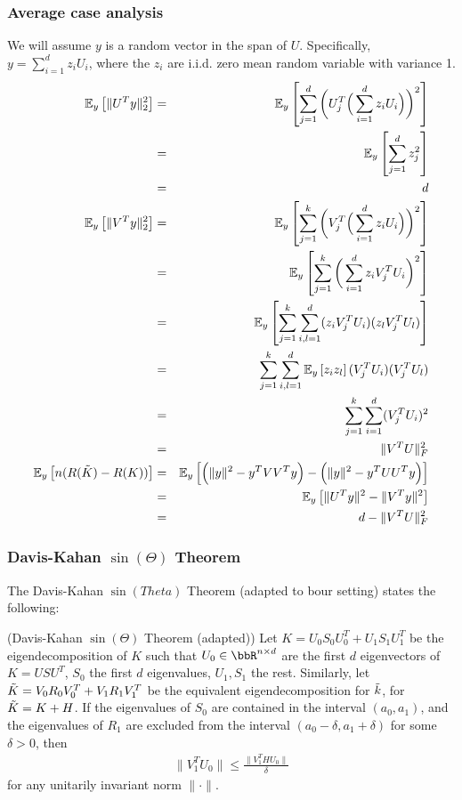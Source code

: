 \subsubsection{Average case analysis}
We will assume $y$ is a random vector in the span of $U$.
Specifically, $y = \sum_{i=1}^d z_i U_i$, where the $z_i$ are i.i.d. zero mean random variable with variance 1.
\begin{eqnarray*}
	\expect{y}{\|U^T y\|_2^2} &=& \expect{y}{\sum_{j=1}^d \bigg( U_j^T \Big(\sum_{i=1}^d z_i U_i\Big)\bigg)^2} \\
	&=& \expect{y}{\sum_{j=1}^d z_j^2} \\
	&=& d \\
	\expect{y}{\|V^T y\|_2^2} &=& \expect{y}{\sum_{j=1}^k \bigg( V_j^T \Big(\sum_{i=1}^d z_i U_i\Big)\bigg)^2} \\
	&=& \expect{y}{\sum_{j=1}^k \bigg(\sum_{i=1}^d z_i V_j^TU_i\bigg)^2} \\
	&=& \expect{y}{\sum_{j=1}^k \sum_{i,l=1}^d (z_i V_j^TU_i) (z_l V_j^TU_l) }\\
	&=& \sum_{j=1}^k \sum_{i,l=1}^d \expect{y}{z_i z_l} (V_j^TU_i) (V_j^TU_l) \\
	&=& \sum_{j=1}^k \sum_{i=1}^d (V_j^TU_i)^2 \\
	&=& \|V^T U\|_F^2\\
	\expect{y}{n(R(\tK) - R(K))} &=& \expect{y}{\Big(\|y\|^2 - y^T VV^T y\Big) - \Big(\|y\|^2 - y^T UU^T y\Big)}\\
	&=& \expect{y}{\|U^T y\|^2 - \|V^Ty\|^2}\\
	&=& d -  \|V^T U\|_F^2\\
\end{eqnarray*}

\subsubsection{Davis-Kahan $\sin(\Theta)$ Theorem}
The Davis-Kahan $\sin(Theta)$ Theorem (adapted to bour setting) states the following:
\begin{theorem}{(Davis-Kahan $\sin(\Theta)$ Theorem (adapted))}
Let $K=U_0 S_0 U_0^T + U_1 S_1 U_1^T$ be the eigendecomposition of $K$ such that $U_0 \in \RR^{n \times d}$ are the first $d$ eigenvectors of $K=USU^T$, $S_0$ the first $d$ eigenvalues, $U_1,S_1$ the rest.
Similarly, let $\tK = V_0 R_0 V_0^T + V_1 R_1 V_1^T$ be the equivalent eigendecomposition for $\tk$, for $\tK = K + H$.
If the eigenvalues of $S_0$ are contained in the interval $(a_0,a_1)$, and the eigenvalues of $R_1$ are excluded from the interval $(a_0 - \delta,a_1 +\delta)$ for some $\delta>0$, then
\begin{eqnarray}
\|V_1^T U_0\| \leq \frac{\|V_1^T H U_0\|}{\delta}
\end{eqnarray}
for any unitarily invariant norm $\|\cdot \|$.
\end{theorem}

